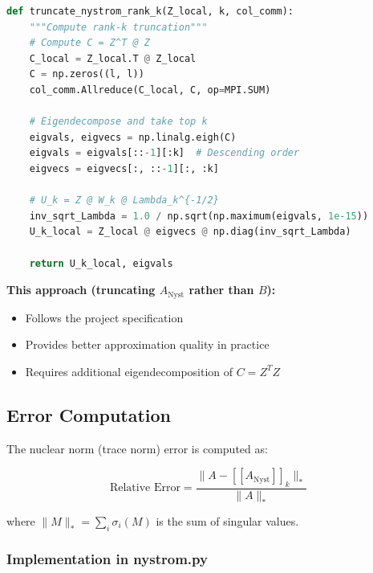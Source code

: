 \documentclass[11pt,a4paper]{article}
\begin{document}
\begin{lstlisting}[language=Python, caption={Rank-k truncation of Nyström approximation}]
def truncate_nystrom_rank_k(Z_local, k, col_comm):
    """Compute rank-k truncation"""
    # Compute C = Z^T @ Z
    C_local = Z_local.T @ Z_local
    C = np.zeros((l, l))
    col_comm.Allreduce(C_local, C, op=MPI.SUM)
    
    # Eigendecompose and take top k
    eigvals, eigvecs = np.linalg.eigh(C)
    eigvals = eigvals[::-1][:k]  # Descending order
    eigvecs = eigvecs[:, ::-1][:, :k]
    
    # U_k = Z @ W_k @ Lambda_k^{-1/2}
    inv_sqrt_Lambda = 1.0 / np.sqrt(np.maximum(eigvals, 1e-15))
    U_k_local = Z_local @ eigvecs @ np.diag(inv_sqrt_Lambda)
    
    return U_k_local, eigvals
\end{lstlisting}

\textbf{This approach (truncating $A_{\text{Nyst}}$ rather than $B$):}
\begin{itemize}
    \item Follows the project specification
    \item Provides better approximation quality in practice
    \item Requires additional eigendecomposition of $C = Z^T Z$
\end{itemize}

\subsection{Error Computation}

The nuclear norm (trace norm) error is computed as:

\begin{equation}
\text{Relative Error} = \frac{\|A - [[A_{\text{Nyst}}]]_k\|_*}{\|A\|_*}
\end{equation}

where $\|M\|_* = \sum_i \sigma_i(M)$ is the sum of singular values.

\subsubsection{Implementation in nystrom.py}
\end{document}
